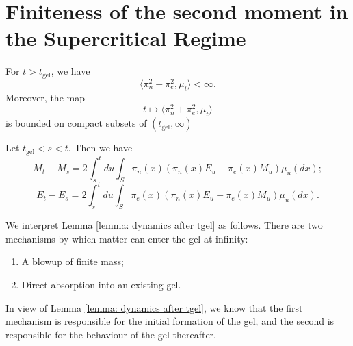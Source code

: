 \section{Finiteness of the second moment in the Supercritical Regime}

\begin{theorem}\label{lemma: second moment finite after tgel} For $t>t_\text{gel}$, we have \begin{equation}
    \langle \pi_n^2+\pi_e^2, \mu_t\rangle <\infty.
\end{equation} Moreover, the map \begin{equation}
    t\mapsto \langle \pi_n^2+\pi_e^2, \mu_t \rangle
\end{equation} is bounded on compact subsets of $(t_\text{gel},\infty)$ \end{theorem}
\begin{lemma}\label{lemma: dynamics after tgel} Let $t_\text{gel}<s<t$. Then we have \begin{equation}
    M_t-M_s=2\int_s^t du \int_S \pi_n(x)(\pi_n(x)E_u+\pi_e(x)M_u)\mu_u(dx);
\end{equation}\begin{equation}
    E_t-E_s=2\int_s^t du \int_S \pi_e(x)(\pi_n(x)E_u+\pi_e(x)M_u)\mu_u(dx).
\end{equation}\end{lemma} \begin{remark} We interpret Lemma \ref{lemma: dynamics after tgel} as follows. There are two mechanisms by which matter can enter the gel at infinity: \begin{enumerate}[label=\roman{*}).]
    \item A blowup of finite mass;
    \item Direct absorption into an existing gel.
\end{enumerate} In view of Lemma \ref{lemma: dynamics after tgel}, we know that the first mechanism is responsible for the initial formation of the gel, and the second is responsible for the behaviour of the gel thereafter.  \end{remark}
